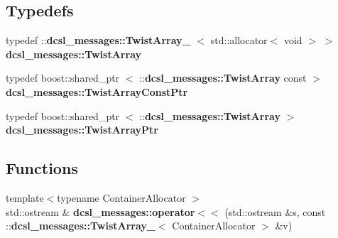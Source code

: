 \subsection*{\-Typedefs}
\begin{DoxyCompactItemize}
\item 
typedef \*
\-::{\bf dcsl\-\_\-messages\-::\-Twist\-Array\-\_\-}\*
$<$ std\-::allocator$<$ void $>$ $>$ {\bf dcsl\-\_\-messages\-::\-Twist\-Array}
\item 
typedef boost\-::shared\-\_\-ptr\*
$<$ \-::{\bf dcsl\-\_\-messages\-::\-Twist\-Array} \*
const  $>$ {\bf dcsl\-\_\-messages\-::\-Twist\-Array\-Const\-Ptr}
\item 
typedef boost\-::shared\-\_\-ptr\*
$<$ \-::{\bf dcsl\-\_\-messages\-::\-Twist\-Array} $>$ {\bf dcsl\-\_\-messages\-::\-Twist\-Array\-Ptr}
\end{DoxyCompactItemize}
\subsection*{\-Functions}
\begin{DoxyCompactItemize}
\item 
{\footnotesize template$<$typename Container\-Allocator $>$ }\\std\-::ostream \& {\bf dcsl\-\_\-messages\-::operator$<$$<$} (std\-::ostream \&s, const \-::{\bf dcsl\-\_\-messages\-::\-Twist\-Array\-\_\-}$<$ \-Container\-Allocator $>$ \&v)
\end{DoxyCompactItemize}
